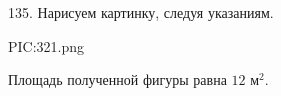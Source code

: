 135. Нарисуем картинку, следуя указаниям.
\begin{center}
{{PIC:321.png}}
\end{center}
Площадь полученной фигуры равна $12\text{ м}^2.$
\newpage\noindent
